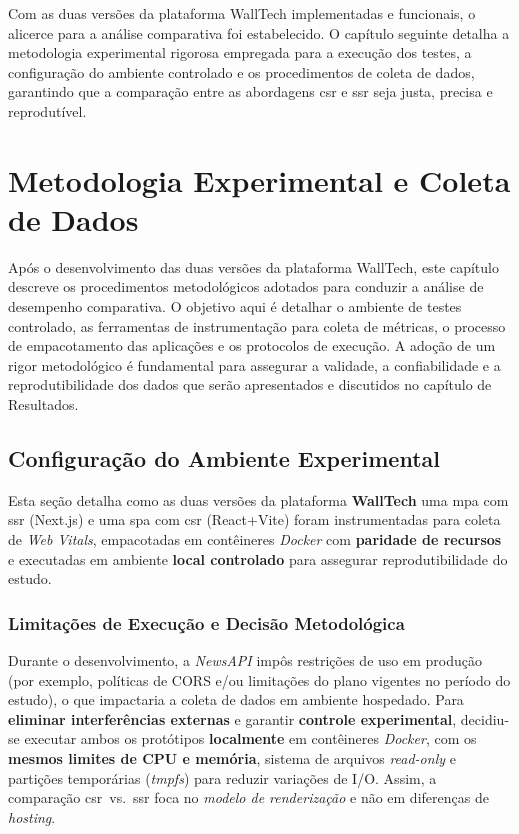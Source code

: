 \vspace{1cm}
Com as duas versões da plataforma WallTech implementadas e funcionais, o alicerce para a análise comparativa foi estabelecido. O capítulo seguinte detalha a metodologia experimental rigorosa empregada para a execução dos testes, a configuração do ambiente controlado e os procedimentos de coleta de dados, garantindo que a comparação entre as abordagens \acrshort{csr} e \acrshort{ssr} seja justa, precisa e reprodutível.



\chapter{Metodologia Experimental e Coleta de Dados}
\label{cap:metodologia_experimental}

Após o desenvolvimento das duas versões da plataforma WallTech, este capítulo descreve os procedimentos metodológicos adotados para conduzir a análise de desempenho comparativa. O objetivo aqui é detalhar o ambiente de testes controlado, as ferramentas de instrumentação para coleta de métricas, o processo de empacotamento das aplicações e os protocolos de execução. A adoção de um rigor metodológico é fundamental para assegurar a validade, a confiabilidade e a reprodutibilidade dos dados que serão apresentados e discutidos no capítulo de Resultados.



\section{Configuração do Ambiente Experimental}
\label{sec:ambiente-experimental}

Esta seção detalha como as duas versões da plataforma \textbf{WallTech} uma \acrshort{mpa} com \acrshort{ssr} (Next.js) e uma \acrshort{spa} com \acrshort{csr} (React+Vite) foram instrumentadas para coleta de \textit{Web Vitals}, empacotadas em contêineres \textit{Docker} com \textbf{paridade de recursos} e executadas em ambiente \textbf{local controlado} para assegurar reprodutibilidade do estudo.

\subsection{Limitações de Execução e Decisão Metodológica}
\label{ssec:limitacoes-execucao}

Durante o desenvolvimento, a \textit{NewsAPI} impôs restrições de uso em produção (por exemplo, políticas de CORS e/ou limitações do plano vigentes no período do estudo), o que impactaria a coleta de dados em ambiente hospedado. Para \textbf{eliminar interferências externas} e garantir \textbf{controle experimental}, decidiu-se executar ambos os protótipos \textbf{localmente} em contêineres \textit{Docker}, com os \textbf{mesmos limites de CPU e memória}, sistema de arquivos \textit{read-only} e partições temporárias (\textit{tmpfs}) para reduzir variações de I/O. Assim, a comparação \acrshort{csr}~vs.~\acrshort{ssr} foca no \textit{modelo de renderização} e não em diferenças de \textit{hosting}.

